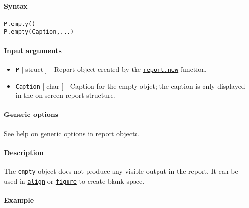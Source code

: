 


	\paragraph{Syntax}

\begin{verbatim}
P.empty()
P.empty(Caption,...)
\end{verbatim}

\paragraph{Input arguments}

\begin{itemize}
\item
  \texttt{P} {[} struct {]} - Report object created by the
  \href{report/new}{\texttt{report.new}} function.
\item
  \texttt{Caption} {[} char {]} - Caption for the empty objet; the
  caption is only displayed in the on-screen report structure.
\end{itemize}

\paragraph{Generic options}

See help on \href{report/Contents}{generic options} in report objects.

\paragraph{Description}

The \texttt{empty} object does not produce any visible output in the
report. It can be used in \href{report/align}{\texttt{align}} or
\href{report/figure}{\texttt{figure}} to create blank space.

\paragraph{Example}



